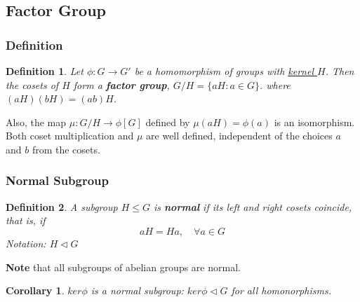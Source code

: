 \documentclass[11pt,a4paper]{article}
\newtheorem{corollary}{Corollary}
\newtheorem{definition}{Definition}
\begin{document}
\subsection{Factor Group}
\subsubsection{Definition}
\begin{definition}
    Let $\phi: G \rightarrow G'$ be a homomorphism of groups with \underline{kernel $H$}. Then the cosets of $H$ form
    a \textbf{factor group}, $G/H=\{aH:a\in G\}$. where $(aH)(bH) = (ab)H$.
\end{definition}
Also, the map $\mu: G/H \rightarrow \phi[G]$
    defined by $\mu(aH) = \phi(a)$ is an isomorphism. Both coset multiplication and $\mu$ are well
    defined, independent of the choices $a$ and $b$ from the cosets.


\subsubsection{Normal Subgroup}
\begin{definition}
    A subgroup $H\leq G$ is \textbf{normal} if its left and right cosets coincide, that is, if $$aH=Ha,\quad \forall a\in G$$
    Notation: $H \lhd G$
\end{definition}
\textbf{Note} that all subgroups of abelian groups are normal.
\begin{corollary}
    $ker\phi$ is a normal subgroup: $ker\phi \lhd G$ for all homonorphisms.
\end{corollary}
\end{document}
